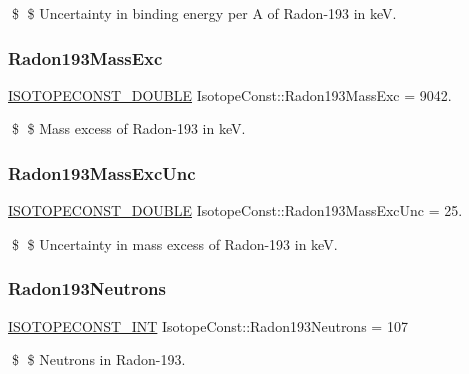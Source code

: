 \$ \$ Uncertainty in binding energy per A of Radon-\/193 in keV. \mbox{\label{group___isotope_const-_radon-_rn193_gaa83a4fada845935d36f14df1e8aa797a}} 
\subsubsection{\texorpdfstring{Radon193\+Mass\+Exc}{Radon193MassExc}}
{\footnotesize\ttfamily \mbox{\hyperlink{group___isotope_const-_macros_ga8f45a7272ce02c0b4c65c44636ed719a}{I\+S\+O\+T\+O\+P\+E\+C\+O\+N\+S\+T\+\_\+\+D\+O\+U\+B\+LE}} Isotope\+Const\+::\+Radon193\+Mass\+Exc = 9042.}

\$ \$ Mass excess of Radon-\/193 in keV. \mbox{\label{group___isotope_const-_radon-_rn193_ga83489061892fc2a1e3d3b921d3721558}} 
\subsubsection{\texorpdfstring{Radon193\+Mass\+Exc\+Unc}{Radon193MassExcUnc}}
{\footnotesize\ttfamily \mbox{\hyperlink{group___isotope_const-_macros_ga8f45a7272ce02c0b4c65c44636ed719a}{I\+S\+O\+T\+O\+P\+E\+C\+O\+N\+S\+T\+\_\+\+D\+O\+U\+B\+LE}} Isotope\+Const\+::\+Radon193\+Mass\+Exc\+Unc = 25.}

\$ \$ Uncertainty in mass excess of Radon-\/193 in keV. \mbox{\label{group___isotope_const-_radon-_rn193_ga3db7c38534ae53acf747122594eab1a9}} 
\subsubsection{\texorpdfstring{Radon193\+Neutrons}{Radon193Neutrons}}
{\footnotesize\ttfamily \mbox{\hyperlink{group___isotope_const-_macros_ga5f18360b3e99483a35c32d789e62621c}{I\+S\+O\+T\+O\+P\+E\+C\+O\+N\+S\+T\+\_\+\+I\+NT}} Isotope\+Const\+::\+Radon193\+Neutrons = 107}

\$ \$ Neutrons in Radon-\/193. \mbox{\label{group___isotope_const-_radon-_rn193_ga95620ec9718feb7e9ee83ee0dd991903}} 
